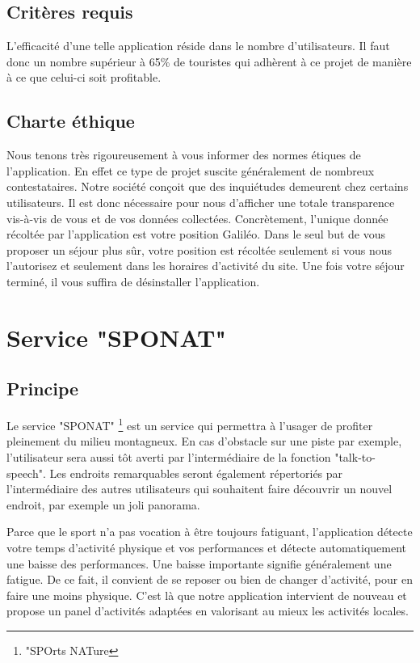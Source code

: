 \documentclass{report}
\newcommand{\n}{\newline}
\begin{document}
\subsection{Critères requis}
L’efficacité d’une telle application réside dans le nombre d’utilisateurs. Il faut donc un nombre supérieur à 65\% de touristes qui adhèrent à ce projet de manière à ce que celui-ci soit profitable.\n

\subsection{Charte éthique}
Nous tenons très rigoureusement à vous informer des normes étiques de l’application. En effet ce type de projet suscite généralement de nombreux contestataires. Notre société conçoit que des inquiétudes demeurent chez certains utilisateurs. Il est donc nécessaire pour nous d’afficher une totale transparence vis-à-vis de vous et de vos données collectées.\n
Concrètement, l’unique donnée récoltée par l’application est votre position Galiléo. Dans le seul but de vous proposer un séjour plus sûr, votre position est récoltée seulement si vous nous l’autorisez et seulement dans les horaires d’activité du site. \newline 
Une fois votre séjour terminé, il vous suffira de désinstaller l’application.\n

\section{Service "SPONAT"} 

\subsection{Principe}

Le service "SPONAT" \footnote{"SPOrts NATure} est un service qui permettra à l'usager de profiter pleinement du milieu montagneux. \n
En cas d'obstacle sur une piste par exemple, l'utilisateur sera aussi tôt averti par l'intermédiaire de la fonction "talk-to-speech".
Les endroits remarquables seront également répertoriés par l'intermédiaire des autres utilisateurs qui souhaitent faire découvrir un nouvel endroit, par exemple un joli panorama. \n

Parce que le sport n'a pas vocation à être toujours fatiguant, l'application détecte votre temps d'activité physique et vos performances et détecte automatiquement une baisse des performances. Une baisse importante signifie généralement une fatigue. \n \n
De ce fait, il convient de se reposer ou bien de changer d'activité, pour en faire une moins physique. \n
C'est là que notre application intervient de nouveau et propose un panel d'activités adaptées en valorisant au mieux les activités locales.
\end{document}
